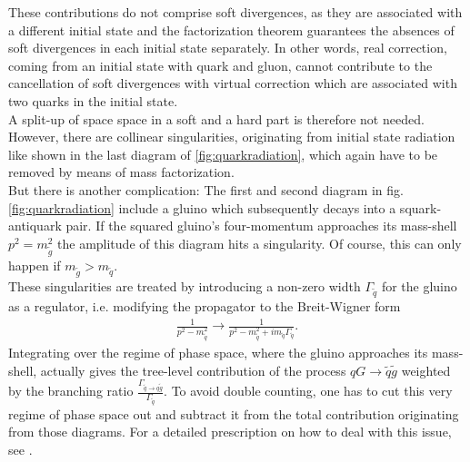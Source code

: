 These contributions do not comprise soft divergences, as they are associated with a different initial state and the factorization theorem guarantees the absences of soft divergences in each initial state separately. In other words, real correction, coming from an initial state with quark and gluon, cannot contribute to the cancellation of soft divergences with virtual correction which are associated with two quarks in the initial state.\\
A split-up of space space in a soft and a hard part is therefore not needed. However, there are collinear singularities, originating from initial state radiation like shown in the last diagram of \ref{fig:quarkradiation}, which again have to be removed by means of mass factorization.\\
But there is another complication: The first and second diagram in fig. \ref{fig:quarkradiation} include a gluino which subsequently decays into a squark-antiquark pair. If the squared gluino's four-momentum approaches its mass-shell $p^2 = m^2_{\tilde{g}}$ the amplitude of this diagram hits a singularity. Of course, this can only happen if $m_{\tilde{g}} > m_{\tilde{q}}$.\\
These singularities are treated by introducing a non-zero width $\Gamma_{\tilde{q}}$ for the gluino as a regulator, i.e. modifying the propagator to the Breit-Wigner form
\begin{align}
\frac{1}{p^2 - m_{\tilde{q}}^2} \to \frac{1}{p^2 - m_{\tilde{q}}^2 + i m_{\tilde{q}} \Gamma_{\tilde{q}}}.
\end{align}
Integrating over the regime of phase space, where the gluino approaches its mass-shell, actually gives the tree-level contribution of the process $qG \to \tilde{q}\tilde{g}$ weighted by the branching ratio $\frac{\Gamma_{\tilde{q}\to q \tilde{g}}}{\Gamma_{\tilde{q}}}$. To avoid double counting, one has to cut this very regime of phase space out and subtract it from the total contribution originating from those diagrams. For a detailed prescription on how to deal with this issue, see \cite{Beenakker:1996ch, Gavin:2013kga}.



\newpage